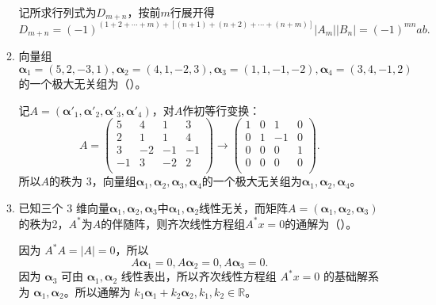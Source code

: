 \begin{enumerate}[1~]
\begin{enumerate}[1.~]
\begin{solution}
记所求行列式为$D_{m+n}$，按前$m$行展开得\[
D_{m+n}=(-1)^{(1+2+\cdots+m)+[(n+1)+(n+2)+\cdots+(n+m)]}|A_m||B_n|=(-1)^{mn}ab.
\]
\end{solution}

\item
向量组$\boldsymbol{\alpha} _ { 1 } = ( 5,2 , - 3,1 ) ,  \boldsymbol{\alpha} _ { 2 } = ( 4,1 , - 2,3 ) ,  \boldsymbol{\alpha} _ { 3 } = ( 1,1 , - 1 , - 2 ) ,  \boldsymbol{\alpha} _ { 4 } = ( 3,4 , - 1,2 )$的一个极大无关组为（\quad）。
\begin{solution}
记$A=(\boldsymbol{\alpha}'_1, \boldsymbol{\alpha}'_2, \boldsymbol{\alpha}'_3, \boldsymbol{\alpha}'_4)$，对$A$作初等行变换：\[
A=\left( \begin{matrix}
	5&		4&		1&		3\\
	2&		1&		1&		4\\
	3&		-2&		-1&		-1\\
	-1&		3&		-2&		2\\
\end{matrix} \right) \rightarrow \left(
\begin{array}{cccc}
 1 & 0 & 1 & 0 \\
 0 & 1 & -1 & 0 \\
 0 & 0 & 0 & 1 \\
 0 & 0 & 0 & 0 \\
\end{array}
\right) .
\]
所以$A$的秩为 $3$，向量组$\boldsymbol{\alpha} _ { 1 },  \boldsymbol{\alpha} _ { 2 } ,  \boldsymbol{\alpha} _ { 3 } ,  \boldsymbol{\alpha} _ { 4 } $的一个极大无关组为$\boldsymbol{\alpha} _ { 1 },  \boldsymbol{\alpha} _ { 2 } ,  \boldsymbol{\alpha} _ { 4 } $。
\end{solution}

\item
已知三个 $3$ 维向量$\boldsymbol{\alpha} _ { 1 } ,  \boldsymbol{\alpha} _ { 2 } ,  \boldsymbol{\alpha} _ { 3 }$中$\boldsymbol{\alpha} _ { 1 } ,  \boldsymbol{\alpha} _ { 2 }$线性无关，而矩阵$A = \left( \boldsymbol{\alpha} _ { 1 } , \boldsymbol{\alpha} _ { 2 } , \boldsymbol{\alpha} _ { 3 } \right)$的秩为2，$A^*$为$A$的伴随阵，则齐次线性方程组$A^*x=0$的通解为（\quad）。
\begin{solution}
因为 $A^* A=|A|=0$，所以\[
A\boldsymbol{\alpha}_1=0, A\boldsymbol{\alpha}_2=0, A \boldsymbol{\alpha}_3 = 0.
\]
因为 $\boldsymbol{\alpha}_3$ 可由 $\boldsymbol{\alpha}_1, \boldsymbol{\alpha}_2$ 线性表出，所以齐次线性方程组 $A^*x = 0$ 的基础解系为 $\boldsymbol{\alpha}_1, \boldsymbol{\alpha}_2$。所以通解为 $k_1 \boldsymbol{\alpha}_1 + k_2 \boldsymbol{\alpha}_2, k_1, k_2 \in \mathbb{R}$。
\end{solution}


\end{enumerate}
\end{enumerate}
